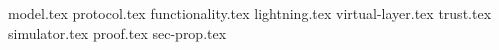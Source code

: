 \documentclass{llncs}
\begin{document}
\pagestyle{plain}
{model.tex}
{protocol.tex}
{functionality.tex}
{lightning.tex}
{virtual-layer.tex}
{trust.tex}
{simulator.tex}
{proof.tex}
{sec-prop.tex}


\end{document}
